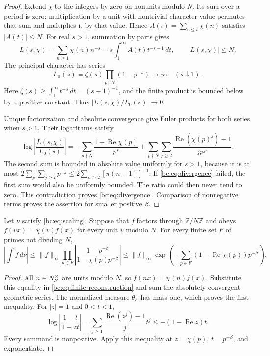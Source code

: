 \begin{proof}
Extend \(\chi\) to the integers by zero on nonunits modulo \(N\).
Its sum over a period is zero: multiplication by a unit with nontrivial
character value permutes that sum and multiplies it by that value.
Hence \(A(t)=\sum_{n\leq t}\chi(n)\) satisfies \(|A(t)|\leq N\).
For real \(s>1\), summation by parts gives
\[
 L(s,\chi)=\sum_{n\geq1}\chi(n)n^{-s}
   =s\int_1^\infty A(t)t^{-s-1}\,dt,
 \qquad |L(s,\chi)|\leq N.
\]
The principal character has series
\[
 L_0(s)=\zeta(s)\prod_{p\mid N}(1-p^{-s})\longrightarrow\infty
 \quad(s\downarrow1).
\]
Here \(\zeta(s)\geq\int_1^\infty t^{-s}\,dt=(s-1)^{-1}\),
and the finite product is bounded below by a positive constant.
Thus \(|L(s,\chi)/L_0(s)|\to0\).

Unique factorization and absolute convergence give Euler products for
both series when \(s>1\). Their logarithms satisfy
\begin{equation}\label{bc:eq:log-ratio}
 \log\left|\frac{L(s,\chi)}{L_0(s)}\right|
 =-\sum_{p\nmid N}\frac{1-\operatorname{Re}\chi(p)}{p^s}
  +\sum_{p\nmid N}\sum_{j\geq2}
     \frac{\operatorname{Re}(\chi(p)^j)-1}{jp^{js}}.
\end{equation}
The second sum is bounded in absolute value uniformly for \(s>1\),
because it is at most
\(2\sum_p\sum_{j\geq2}p^{-j}\leq2\sum_{n\geq2}[n(n-1)]^{-1}\).
If \eqref{bc:eq:divergence} failed, the first sum would also be uniformly
bounded. The ratio could then never tend to zero. This contradiction
proves \eqref{bc:eq:divergence}. Comparison of nonnegative terms proves
the assertion for smaller positive \(\beta\).
\end{proof}

\begin{lemma}\label{bc:lem:contraction}
Let \(\nu\) satisfy \eqref{bc:eq:scaling}. Suppose that \(f\) factors
through \(\mathbb Z/N\mathbb Z\) and obeys
\(f(vx)=\chi(v)f(x)\) for every unit \(v\) modulo \(N\).
For every finite set \(F\) of primes not dividing \(N\),
\begin{equation}\label{bc:eq:contraction}
 \left|\int f\,d\nu\right|
 \leq\|f\|_\infty
       \prod_{p\in F}\left|\frac{1-p^{-\beta}}
                              {1-\chi(p)p^{-\beta}}\right|
 \leq\|f\|_\infty
       \exp\left(-\sum_{p\in F}(1-\operatorname{Re}\chi(p))p^{-\beta}\right).
\end{equation}
\end{lemma}

\begin{proof}
All \(n\in N^{\times}_F\) are units modulo \(N\), so
\(f(nx)=\chi(n)f(x)\). Substitute this equality in
\eqref{bc:eq:finite-reconstruction} and sum the absolutely convergent
geometric series. The normalized measure \(\theta_F\) has mass one,
which proves the first inequality. For \(|z|=1\) and \(0<t<1\),
\[
 \log\left|\frac{1-t}{1-zt}\right|
   =\sum_{j\geq1}\frac{\operatorname{Re}(z^j)-1}{j}t^j
   \leq-(1-\operatorname{Re}z)t.
\]
Every summand is nonpositive. Apply this inequality at
\(z=\chi(p)\), \(t=p^{-\beta}\), and exponentiate.
\end{proof}

